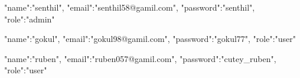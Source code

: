 {
    "name":"senthil",
    "email":"senthil58@gamil.com",
    "password":"senthil",
    "role":"admin"
}
{

    "name":"gokul",
    "email":"gokul98@gamil.com",
    "password":"gokul77",
    "role":"user"
}
{
    "name":"ruben",
    "email":"ruben057@gamil.com",
    "password":"cutey_ruben",
    "role":"user"
}